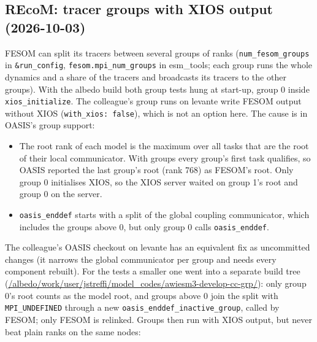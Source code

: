 \documentclass[11pt,a4paper]{article}
\begin{document}
\subsection{REcoM: tracer groups with XIOS output (2026-10-03)}
FESOM can split its tracers between several groups of ranks (\texttt{num\_fesom\_groups} in \texttt{\&run\_config}, \texttt{fesom.mpi\_num\_groups} in esm\_tools; each group runs the whole dynamics and a share of the tracers and broadcasts its tracers to the other groups). With the albedo build both group tests hung at start-up, group 0 inside \texttt{xios\_initialize}. The colleague's group runs on levante write FESOM output without XIOS (\texttt{with\_xios: false}), which is not an option here. The cause is in OASIS's group support:
\begin{itemize}
\item The root rank of each model is the maximum over all tasks that are the root of their local communicator. With groups every group's first task qualifies, so OASIS reported the last group's root (rank 768) as FESOM's root. Only group 0 initialises XIOS, so the XIOS server waited on group 1's root and group 0 on the server.
\item \texttt{oasis\_enddef} starts with a split of the global coupling communicator, which includes the groups above 0, but only group 0 calls \texttt{oasis\_enddef}.
\end{itemize}
The colleague's OASIS checkout on levante has an equivalent fix as uncommitted changes (it narrows the global communicator per group and needs every component rebuilt). For the tests a smaller one went into a separate build tree (\url{/albedo/work/user/jstreffi/model_codes/awiesm3-develop-cc-grp/}): only group 0's root counts as the model root, and groups above 0 join the split with \texttt{MPI\_UNDEFINED} through a new \texttt{oasis\_enddef\_inactive\_group}, called by FESOM; only FESOM is relinked. Groups then run with XIOS output, but never beat plain ranks on the same nodes:
\end{document}
